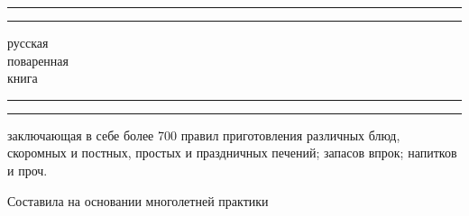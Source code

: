 \documentclass[a4paper,12pt]{book}
\begin{document}
\begin{titlepage} %

	\centering %
	
	\scshape %
	
	\vspace*{\baselineskip} %
	
	
	\rule{\textwidth}{1.6pt}\vspace*{-\baselineskip}\vspace*{2pt} %
	\rule{\textwidth}{0.4pt} %
	
	\vspace{0.75\baselineskip} %
	
	{\LARGE русская \\ поваренная \\ книга } %
	
	\vspace{0.75\baselineskip} %
	
	\rule{\textwidth}{0.4pt}\vspace*{-\baselineskip}\vspace{3.2pt} %
	\rule{\textwidth}{1.6pt} %
	
	\vspace{2\baselineskip} %
	
	
	заключающая в себе более 700 правил приготовления различных блюд, скоромных и постных, простых и праздничных печений; запасов впрок; напитков и проч.%
	
	\vspace*{3\baselineskip} %
	
	
	 Составила на основании многолетней практики
	

\end{titlepage}
\end{document}
